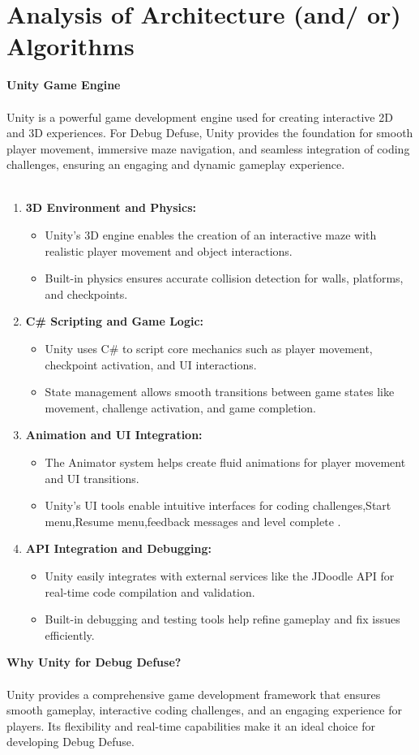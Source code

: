 \section{Analysis of Architecture (and/ or) Algorithms}
{\large \textbf{Unity Game Engine}}\\\\
Unity is a powerful game development engine used for creating interactive 2D and 3D experiences. For Debug Defuse, Unity provides the foundation for smooth player movement, immersive maze navigation, and seamless integration of coding challenges, ensuring an engaging and dynamic gameplay experience.\\\\
\begin{enumerate}
    \item \textbf{3D Environment and Physics:}
    \begin{itemize}
        \item Unity’s 3D engine enables the creation of an interactive maze with realistic player movement and object interactions.
        \item Built-in physics ensures accurate collision detection for walls, platforms, and checkpoints.
    \end{itemize}
    \item \textbf{C\# Scripting and Game Logic:}
    \begin{itemize}
        \item Unity uses C\# to script core mechanics such as player movement, checkpoint activation, and UI interactions.
        \item State management allows smooth transitions between game states like movement, challenge activation, and game completion.
    \end{itemize}
    \item \textbf{Animation and UI Integration:}
    \begin{itemize}
        \item The Animator system helps create fluid animations for player movement and UI transitions.
        \item Unity’s UI tools enable intuitive interfaces for coding challenges,Start menu,Resume menu,feedback messages and level complete .
    \end{itemize}
    \item \textbf{API Integration and Debugging:}
    \begin{itemize}
        \item Unity easily integrates with external services like the JDoodle API for real-time code compilation and validation.
        \item Built-in debugging and testing tools help refine gameplay and fix issues efficiently.
    \end{itemize}
\end{enumerate}
\textbf{Why Unity for Debug Defuse?}\\\\
Unity provides a comprehensive game development framework that ensures smooth gameplay, interactive coding challenges, and an engaging experience for players. Its flexibility and real-time capabilities make it an ideal choice for developing Debug Defuse.
